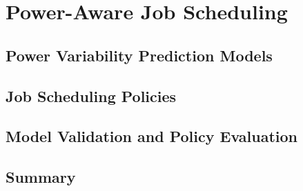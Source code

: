 
\chapter{Power-Aware Job Scheduling}
\label{chap:power_aware_job_scheduling}



\section{Power Variability Prediction Models}
\label{sec:variability_prediction}

\section{Job Scheduling Policies}

\label{sec:job_sched_scheduling}
\section{Model Validation and Policy Evaluation}

\label{sec:job_scheduling_results}

\section{Summary}

\label{sec:job_sched_conclusions}

